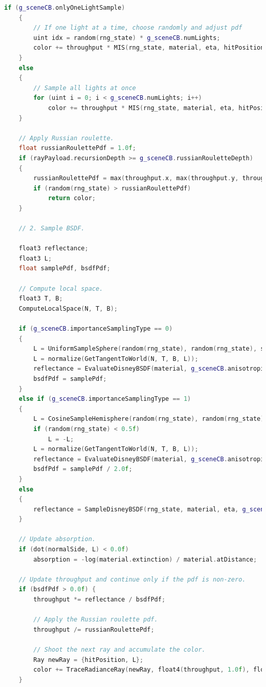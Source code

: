 \documentclass[12pt,a4paper]{report}
\numberwithin{equation}{section} %
\begin{document}
\begin{appendices}
\begin{lstlisting}[caption={Algoritmul Path Tracing},label={lst:pathtracing},language=C++,escapechar=\$]
	if (g_sceneCB.onlyOneLightSample)
	{
		// If one light at a time, choose randomly and adjust pdf
		uint idx = random(rng_state) * g_sceneCB.numLights;
		color += throughput * MIS(rng_state, material, eta, hitPosition, g_lights[idx], normalSide, rayPayload.recursionDepth) * g_sceneCB.numLights;
	}
	else
	{
		// Sample all lights at once
		for (uint i = 0; i < g_sceneCB.numLights; i++)
			color += throughput * MIS(rng_state, material, eta, hitPosition, g_lights[i], normalSide, rayPayload.recursionDepth);
	}

	// Apply Russian roulette.
	float russianRoulettePdf = 1.0f;
	if (rayPayload.recursionDepth >= g_sceneCB.russianRouletteDepth)
	{
		russianRoulettePdf = max(throughput.x, max(throughput.y, throughput.z));
		if (random(rng_state) > russianRoulettePdf)
			return color;
	}

	// 2. Sample BSDF.

	float3 reflectance;
	float3 L;
	float samplePdf, bsdfPdf;

	// Compute local space.
	float3 T, B;
	ComputeLocalSpace(N, T, B);

	if (g_sceneCB.importanceSamplingType == 0)
	{
		L = UniformSampleSphere(random(rng_state), random(rng_state), samplePdf);
		L = normalize(GetTangentToWorld(N, T, B, L));
		reflectance = EvaluateDisneyBSDF(material, g_sceneCB.anisotropicBSDF, eta, -WorldRayDirection(), L, normalSide, bsdfPdf);
		bsdfPdf = samplePdf;
	}
	else if (g_sceneCB.importanceSamplingType == 1)
	{
		L = CosineSampleHemisphere(random(rng_state), random(rng_state), samplePdf);
		if (random(rng_state) < 0.5f)
			L = -L;
		L = normalize(GetTangentToWorld(N, T, B, L));
		reflectance = EvaluateDisneyBSDF(material, g_sceneCB.anisotropicBSDF, eta, -WorldRayDirection(), L, normalSide, bsdfPdf);
		bsdfPdf = samplePdf / 2.0f;
	}
	else
	{
		reflectance = SampleDisneyBSDF(rng_state, material, eta, g_sceneCB.anisotropicBSDF, -WorldRayDirection(), normalSide, L, bsdfPdf);
	}

	// Update absorption.
	if (dot(normalSide, L) < 0.0f)													
		absorption = -log(material.extinction) / material.atDistance;				$\label{line:absorption3}$

	// Update throughput and continue only if the pdf is non-zero.
	if (bsdfPdf > 0.0f) {
		throughput *= reflectance / bsdfPdf;

		// Apply the Russian roulette pdf.
		throughput /= russianRoulettePdf;

		// Shoot the next ray and accumulate the color.
		Ray newRay = {hitPosition, L};
		color += TraceRadianceRay(newRay, float4(throughput, 1.0f), float4(absorption, 1.0f), rayPayload.recursionDepth, dot(N, L) < 0.0f).xyz;
	}


\end{lstlisting}
\end{appendices}
\end{document}

